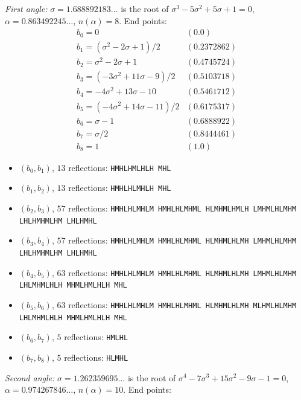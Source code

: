 \medskip\noindent\emph{First angle:} $\sigma = 1.688892183\ldots$ is the root of $\sigma^{3} - 5 \sigma^{2} + 5 \sigma + 1 = 0$, $\alpha = 0.863492245\ldots$, $n(\alpha) = 8$. End points:
\[\begin{array}{ll}
b_{0} = 0 & (0.0) \\
b_{1} = (\sigma^{2} - 2 \sigma + 1)/2 & (0.2372862) \\
b_{2} = \sigma^{2} - 2 \sigma + 1 & (0.4745724) \\
b_{3} = (- 3 \sigma^{2} + 11 \sigma - 9)/2 & (0.5103718) \\
b_{4} = - 4 \sigma^{2} + 13 \sigma - 10 & (0.5461712) \\
b_{5} = (- 4 \sigma^{2} + 14 \sigma - 11)/2 & (0.6175317) \\
b_{6} = \sigma - 1 & (0.6888922) \\
b_{7} = \sigma/2 & (0.8444461) \\
b_{8} = 1 & (1.0)
\end{array}\]
\begin{itemize}\setlength\itemsep{1pt}\small\raggedright
\item[1.] $(b_{0}, b_{1})$, $13$ reflections: \texttt{HMHLHMLHLH\,\allowbreak MHL}
\item[2.] $(b_{1}, b_{2})$, $13$ reflections: \texttt{HMHLHLMHLH\,\allowbreak MHL}
\item[3.] $(b_{2}, b_{3})$, $57$ reflections: \texttt{HMHLHLMHLM\,\allowbreak HMHLHLMHML\,\allowbreak HLMHMLHMLH\,\allowbreak LMHMLHLMHM\,\allowbreak LHLHMHMLHM\,\allowbreak LHLHMHL}
\item[4.] $(b_{3}, b_{4})$, $57$ reflections: \texttt{HMHLHLMHLM\,\allowbreak HMHLHLMHML\,\allowbreak HLMHMLHLMH\,\allowbreak LMHMLHLMHM\,\allowbreak LHLHMHMLHM\,\allowbreak LHLHMHL}
\item[5.] $(b_{4}, b_{5})$, $63$ reflections: \texttt{HMHLHLMHLM\,\allowbreak HMHLHLMHML\,\allowbreak HLMHMLHLMH\,\allowbreak LMHMLHLMHM\,\allowbreak LHLMHMLHLH\,\allowbreak MHMLHMLHLH\,\allowbreak MHL}
\item[6.] $(b_{5}, b_{6})$, $63$ reflections: \texttt{HMHLHLMHLM\,\allowbreak HMHLHLMHML\,\allowbreak HLMHMLHLMH\,\allowbreak MLHMLHLMHM\,\allowbreak LHLMHMLHLH\,\allowbreak MHMLHMLHLH\,\allowbreak MHL}
\item[7.] $(b_{6}, b_{7})$, $5$ reflections: \texttt{HMLHL}
\item[8.] $(b_{7}, b_{8})$, $5$ reflections: \texttt{HLMHL}
\end{itemize}
\medskip\noindent\emph{Second angle:} $\sigma = 1.262359695\ldots$ is the root of $\sigma^{4} - 7 \sigma^{3} + 15 \sigma^{2} - 9 \sigma - 1 = 0$, $\alpha = 0.974267846\ldots$, $n(\alpha) = 10$. End points:
